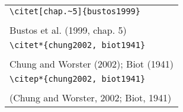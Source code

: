 \documentclass{article}
\begin{document}
\begin{center}
\begin{tabular}{l}
\verb#\citet[chap.~5]{bustos1999}#\\
\citet[chap.~5]{bustos1999}\\
Bustos et al. (1999, chap. 5)\\
\hline 
\verb#\citet*{chung2002, biot1941}#\\
\citet*{chung2002, biot1941}\\
Chung and Worster (2002); Biot (1941)\\
\hline
\verb#\citep*{chung2002, biot1941}#\\
\citep*{chung2002, biot1941}\\
(Chung and Worster, 2002; Biot, 1941)\\
\end{tabular}
\end{center}

%
\end{document}
